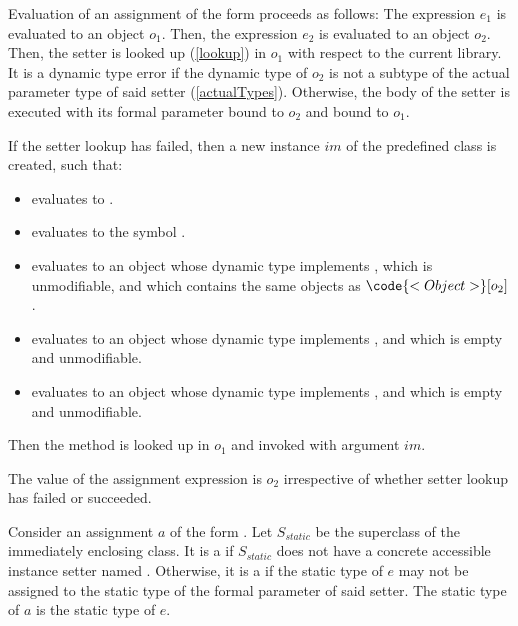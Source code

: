 \documentclass[makeidx]{article}
\begin{document}
\LMHash{}%
Evaluation of an assignment of the form 
proceeds as follows:
The expression $e_1$ is evaluated to an object $o_1$.
Then, the expression $e_2$ is evaluated to an object $o_2$.
Then, the setter  is looked up (\ref{lookup})
in $o_1$ with respect to the current library.
It is a dynamic type error if the dynamic type of $o_2$
is not a subtype of the actual parameter type of said setter
(\ref{actualTypes}).
Otherwise, the body of the setter is executed with
its formal parameter bound to $o_2$ and \THIS{} bound to $o_1$.

\LMHash{}%
If the setter lookup has failed, then a new instance $im$ of
the predefined class  is created, such that:
\begin{itemize}
\item {} evaluates to \TRUE.
\item {} evaluates to the symbol .
\item {} evaluates to an object
  whose dynamic type implements ,
  which is unmodifiable, and which contains the same objects as
  $\code{<Object>}[o_2]$.
\item {} evaluates to an object
  whose dynamic type implements ,
  and which is empty and unmodifiable.
\item {} evaluates to an object
  whose dynamic type implements ,
  and which is empty and unmodifiable.
\end{itemize}

\LMHash{}%
Then the method  is looked up in $o_1$
and invoked with argument $im$.


\LMHash{}%
The value of the assignment expression is $o_2$
irrespective of whether setter lookup has failed or succeeded.
\EndCase

\LMHash{}%
Consider an assignment $a$ of the form .
Let $S_{static}$ be the superclass of the immediately enclosing class.
It is a  if $S_{static}$ does not have
a concrete accessible instance setter named .
Otherwise, it is a  if the static type of $e$
may not be assigned to the static type of the formal parameter of said setter.
The static type of $a$ is the static type of $e$.
\end{document}
